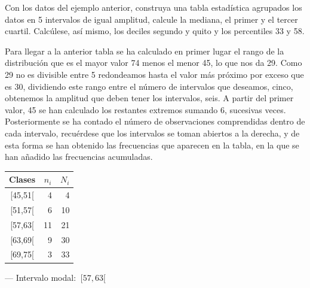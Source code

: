 \vspace{5mm}%
\begin{example}

	 Con los datos del ejemplo anterior, construya una tabla estadística  agrupados los datos en 5 intervalos de igual amplitud, calcule la mediana, el primer y el tercer cuartil.	Calcúlese, así mismo, los deciles segundo y quito y los percentiles 33 y 58.

\vspace{4mm} \begin{small}Para llegar a la anterior tabla se ha calculado en primer lugar el rango de la distribución que es el mayor valor 74 menos el menor 45, lo que nos da 29. Como 29 no es divisible entre 5 redondeamos hasta el valor más próximo por exceso que es 30, dividiendo este rango entre el número de intervalos que deseamos, cinco, obtenemos la amplitud que deben tener los intervalos, seis. A partir del primer valor, 45 se han calculado los restantes extremos sumando 6, sucesivas veces. Posteriormente se ha contado el número de observaciones comprendidas dentro de cada intervalo, recuérdese que los intervalos se toman abiertos a la derecha, y de esta forma se han obtenido las frecuencias que aparecen en la tabla, en la que se han añadido las frecuencias acumuladas.\end{small}

\begin{multicols}{2}
\begin{table}[H]
\begin{tabular}{crr}
\textbf{Clases}                  & \multicolumn{1}{|c|}{\textbf{$n_i$}} & \multicolumn{1}{c}{\textbf{$N_i$}} \\ \hline
\multicolumn{1}{c|}{{[}45,51{[}} & \multicolumn{1}{r|}{4}             & 4                                  \\
\multicolumn{1}{c|}{{[}51,57{[}} & \multicolumn{1}{r|}{6}             & 10                                 \\
\multicolumn{1}{c|}{{[}57,63{[}} & \multicolumn{1}{r|}{11}            & 21                                 \\
\multicolumn{1}{c|}{{[}63,69{[}} & \multicolumn{1}{r|}{9}             & 30                                 \\
\multicolumn{1}{c|}{{[}69,75{[}} & \multicolumn{1}{r|}{3}             & 33                                
\end{tabular}
\end{table}
--- Intervalo modal: $\ [57,63[$


\end{multicols}
\end{example}
